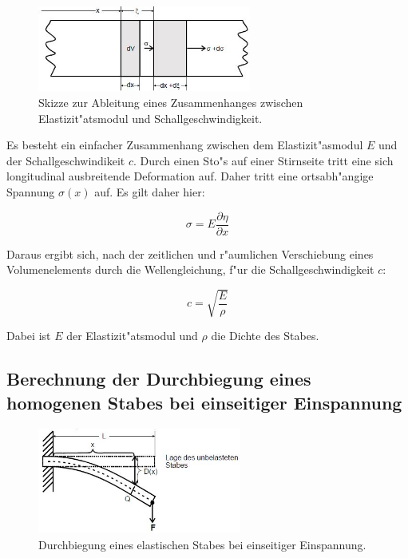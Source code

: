 	\begin{figure}[!h]
		\centering
		\includegraphics[width = 7cm]{img/schall.JPG}
		\caption{Skizze zur Ableitung eines Zusammenhanges zwischen Elastizit"atsmodul und Schallgeschwindigkeit. \cite{anleitung}}
		\label{fg:schall}
	\end{figure}
	
		Es besteht ein einfacher Zusammenhang zwischen dem Elastizit"asmodul $E$ und der Schallgeschwindikeit $c$. Durch einen Sto"s auf einer Stirnseite tritt eine sich longitudinal ausbreitende Deformation auf. Daher tritt eine ortsabh"angige Spannung $\sigma(x)$ auf. Es gilt daher hier:

		\begin{equation}
			\sigma = E \frac{\partial \eta}{\partial x}
		\end{equation}

		Daraus ergibt sich, nach der zeitlichen und r"aumlichen Verschiebung eines Volumenelements durch die Wellengleichung, f"ur die Schallgeschwindigkeit $c$:

		\begin{equation}
			c = \sqrt{\frac{E}{\rho}}
		\end{equation}

		Dabei ist $E$ der Elastizit"atsmodul und $\rho$ die Dichte des Stabes.

	\subsection{Berechnung der Durchbiegung eines homogenen Stabes bei einseitiger Einspannung} %
	\label{sub:1}
	
		\begin{figure}
			\centering
			\includegraphics[width = 6.7cm]{img/biegung.JPG}
			\caption{Durchbiegung eines elastischen Stabes bei einseitiger Einspannung. \cite{anleitung}}
			\label{fg:biegung}
		\end{figure}

